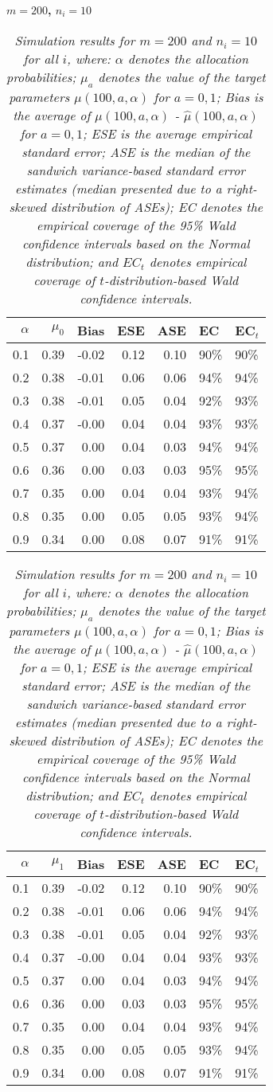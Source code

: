 \documentclass[12pt, letterpaper]{article}
\begin{document}
\begin{center}
	\textbf{$m=200$, $n_i=10$} 
\end{center}
\begin{table}[ht!]
	\centering
	\bgroup
	\def\arraystretch{1.25}
	\setlength\tabcolsep{0.05in}
	\begin{tabular}{rrrrrll}
		\hline
		$\alpha$ & $\mu_0$ & Bias & ESE & ASE & EC & EC$_t$ \\ 
				\hline
		0.1 & 0.39 & -0.02 & 0.12 & 0.10 & 90\% & 90\% \\ 
		0.2 & 0.38 & -0.01 & 0.06 & 0.06 & 94\% & 94\% \\ 
		0.3 & 0.38 & -0.01 & 0.05 & 0.04 & 92\% & 93\% \\ 
		0.4 & 0.37 & -0.00 & 0.04 & 0.04 & 93\% & 93\% \\ 
		0.5 & 0.37 & 0.00 & 0.04 & 0.03 & 94\% & 94\% \\ 
		0.6 & 0.36 & 0.00 & 0.03 & 0.03 & 95\% & 95\% \\ 
		0.7 & 0.35 & 0.00 & 0.04 & 0.04 & 93\% & 94\% \\ 
		0.8 & 0.35 & 0.00 & 0.05 & 0.05 & 93\% & 94\% \\ 
		0.9 & 0.34 & 0.00 & 0.08 & 0.07 & 91\% & 91\% \\ 
		\hline
	\end{tabular}
	\egroup
	\quad 
	\bgroup
	\setlength\tabcolsep{0.05in}
	\def\arraystretch{1.25}
	\begin{tabular}{rrrrrll}
		\hline
		$\alpha$ & $\mu_1$ & Bias & ESE & ASE & EC & EC$_t$ \\
				\hline
		0.1 & 0.39 & -0.02 & 0.12 & 0.10 & 90\% & 90\% \\ 
		0.2 & 0.38 & -0.01 & 0.06 & 0.06 & 94\% & 94\% \\ 
		0.3 & 0.38 & -0.01 & 0.05 & 0.04 & 92\% & 93\% \\ 
		0.4 & 0.37 & -0.00 & 0.04 & 0.04 & 93\% & 93\% \\ 
		0.5 & 0.37 & 0.00 & 0.04 & 0.03 & 94\% & 94\% \\ 
		0.6 & 0.36 & 0.00 & 0.03 & 0.03 & 95\% & 95\% \\ 
		0.7 & 0.35 & 0.00 & 0.04 & 0.04 & 93\% & 94\% \\ 
		0.8 & 0.35 & 0.00 & 0.05 & 0.05 & 93\% & 94\% \\ 
		0.9 & 0.34 & 0.00 & 0.08 & 0.07 & 91\% & 91\% \\ 
		\hline
	\end{tabular}
	\egroup
	\caption*{\textit{Simulation results for $m = 200$ and $n_i = 10$ for all $i$, where: $\alpha$ denotes the allocation probabilities; $\mu_a$ denotes the value of the target parameters $\mu(100, a, \alpha)$ for $a=0,1$; Bias is the average of $\mu(100, a, \alpha)$ - $\hat{\mu}(100, a, \alpha)$ for $a=0, 1$; ESE is the average empirical standard error; ASE is the median of the sandwich variance-based standard error estimates (median presented due to a right-skewed distribution of ASEs); EC denotes the empirical coverage of the 95\% Wald confidence intervals based on the Normal distribution; and $EC_t$ denotes empirical coverage of $t$-distribution-based Wald confidence intervals.}}
\end{table}
\end{document}

